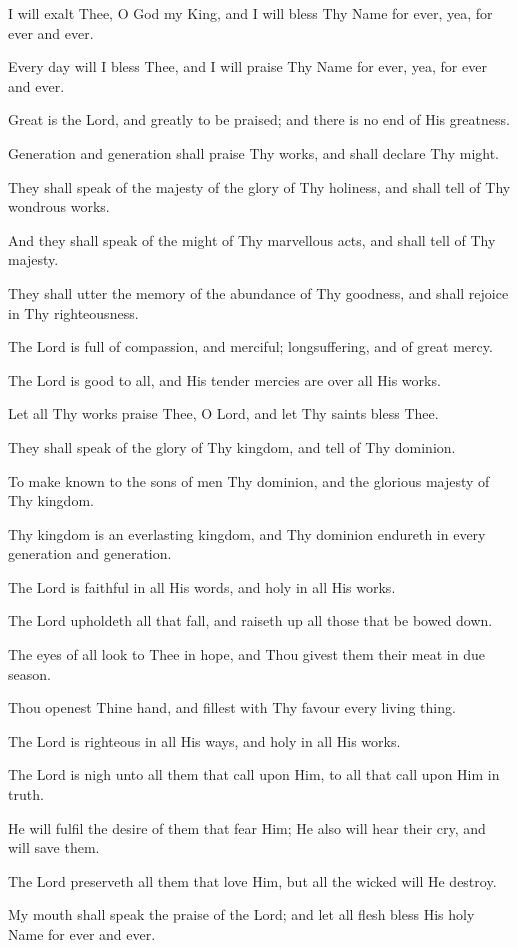 I will exalt Thee, O God my King, and I will bless Thy Name for ever, yea, for ever and ever.

Every day will I bless Thee, and I will praise Thy Name for ever, yea, for ever and ever.

Great is the Lord, and greatly to be praised; and there is no end of His greatness.

Generation and generation shall praise Thy works, and shall declare Thy might.

They shall speak of the majesty of the glory of Thy holiness, and shall tell of Thy wondrous works.

And they shall speak of the might of Thy marvellous acts, and shall tell of Thy majesty.

They shall utter the memory of the abundance of Thy goodness, and shall rejoice in Thy righteousness.

The Lord is full of compassion, and merciful; longsuffering, and of great mercy.

The Lord is good to all, and His tender mercies are over all His works.

Let all Thy works praise Thee, O Lord, and let Thy saints bless Thee.

They shall speak of the glory of Thy kingdom, and tell of Thy dominion.

To make known to the sons of men Thy dominion, and the glorious majesty of Thy kingdom.

Thy kingdom is an everlasting kingdom, and Thy dominion endureth in every generation and generation.

The Lord is faithful in all His words, and holy in all His works.

The Lord upholdeth all that fall, and raiseth up all those that be bowed down.
 
The eyes of all look to Thee in hope, and Thou givest them their meat in due season.

Thou openest Thine hand, and fillest with Thy favour every living thing.

The Lord is righteous in all His ways, and holy in all His works.

The Lord is nigh unto all them that call upon Him, to all that call upon Him in truth.

He will fulfil the desire of them that fear Him; He also will hear their cry, and will save them.

The Lord preserveth all them that love Him, but all the wicked will He destroy.

My mouth shall speak the praise of the Lord; and let all flesh bless His holy Name for ever and ever.
